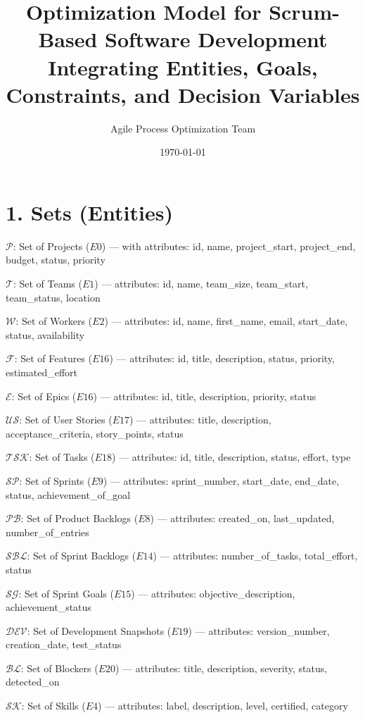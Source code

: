 \documentclass[12pt]{article}
\title{
    \textbf{Optimization Model for Scrum-Based Software Development} \\
    \large Integrating Entities, Goals, Constraints, and Decision Variables
}
\author{Agile Process Optimization Team}
\date{\today}
\begin{document}
\maketitle

\tableofcontents
\newpage

\section{1. Sets (Entities)}
\item $\mathcal{P}$: Set of Projects ($E0$) — with attributes: id, name, project\_start, project\_end, budget, status, priority
    \item $\mathcal{T}$: Set of Teams ($E1$) — attributes: id, name, team\_size, team\_start, team\_status, location
    \item $\mathcal{W}$: Set of Workers ($E2$) — attributes: id, name, first\_name, email, start\_date, status, availability
    \item $\mathcal{F}$: Set of Features ($E16$) — attributes: id, title, description, status, priority, estimated\_effort
    \item $\mathcal{E}$: Set of Epics ($E16$) — attributes: id, title, description, priority, status
    \item $\mathcal{US}$: Set of User Stories ($E17$) — attributes: title, description, acceptance\_criteria, story\_points, status
    \item $\mathcal{TSK}$: Set of Tasks ($E18$) — attributes: id, title, description, status, effort, type
    \item $\mathcal{SP}$: Set of Sprints ($E9$) — attributes: sprint\_number, start\_date, end\_date, status, achievement\_of\_goal
    \item $\mathcal{PB}$: Set of Product Backlogs ($E8$) — attributes: created\_on, last\_updated, number\_of\_entries
    \item $\mathcal{SBL}$: Set of Sprint Backlogs ($E14$) — attributes: number\_of\_tasks, total\_effort, status
    \item $\mathcal{SG}$: Set of Sprint Goals ($E15$) — attributes: objective\_description, achievement\_status
    \item $\mathcal{DEV}$: Set of Development Snapshots ($E19$) — attributes: version\_number, creation\_date, test\_status
    \item $\mathcal{BL}$: Set of Blockers ($E20$) — attributes: title, description, severity, status, detected\_on
    \item $\mathcal{SK}$: Set of Skills ($E4$) — attributes: label, description, level, certified, category
\end{document}
